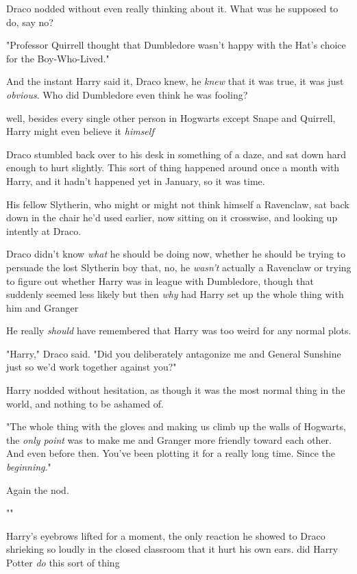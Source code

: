 Draco nodded without even really thinking about it. What was he supposed to do,
say no?

"Professor Quirrell thought that Dumbledore wasn't happy with the Hat's choice
for the Boy-Who-Lived."

And the instant Harry said it, Draco knew, he \emph{knew} that it was true, it
was just \emph{obvious}. Who did Dumbledore even think he was fooling?

{\el} well, besides every single other person in Hogwarts except Snape and
Quirrell, Harry might even believe it \emph{himself}{\el}

Draco stumbled back over to his desk in something of a daze, and sat down hard
enough to hurt slightly. This sort of thing happened around once a month with
Harry, and it hadn't happened yet in January, so it was time.

His fellow Slytherin, who might or might not think himself a Ravenclaw, sat
back down in the chair he'd used earlier, now sitting on it crosswise, and
looking up intently at Draco.

Draco didn't know \emph{what} he should be doing now, whether he should be
trying to persuade the lost Slytherin boy that, no, he \emph{wasn't} actually a
Ravenclaw{\el} or trying to figure out whether Harry was in league with
Dumbledore, though that suddenly seemed less likely{\el} but then \emph{why}
had Harry set up the whole thing with him and Granger{\el}

He really \emph{should} have remembered that Harry was too weird for any normal
plots.

"Harry," Draco said. "Did you deliberately antagonize me and General Sunshine
just so we'd work together against you?"

Harry nodded without hesitation, as though it was the most normal thing in the
world, and nothing to be ashamed of.

"The whole thing with the gloves and making us climb up the walls of Hogwarts,
the \emph{only point} was to make me and Granger more friendly toward each
other. And even before then. You've been plotting it for a really long time.
Since the \emph{beginning}."

Again the nod.

""

Harry's eyebrows lifted for a moment, the only reaction he showed to Draco
shrieking so loudly in the closed classroom that it hurt his own ears.
 did Harry Potter \emph{do} this sort of thing{\el}

